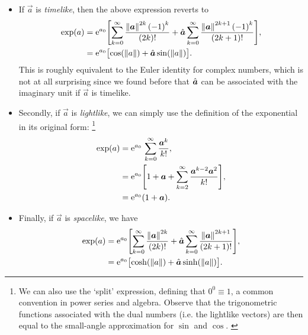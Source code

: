 \begin{itemize}
    \item If \(\vec{a}\) is \emph{timelike}, then the above expression reverts to
        \begin{equation}
            \begin{split}
                \exp(a) &= \ec^{a_0}\qty[\sum_{k=0}^\infty \frac{\norm{\vec{a}}^{2k}\,\qty(-1)^k}{(2k)!} + \uvec{a}\sum_{k=0}^\infty \frac{\norm{\vec{a}}^{2k+1} \, \qty(-1)^k}{(2k+1)!}], \\
                        &= \ec^{a_0}\qty\big[\cos(\norm{a})  + \uvec{a}\sin(\norm{a})]. \\
            \end{split}
        \end{equation}
        This is roughly equivalent to the Euler identity for complex numbers, which is not at all surprising since we found before that \(\uvec{a}\) can be associated with the imaginary unit if \(\vec{a}\) is timelike.
    \item Secondly, if \(\vec{a}\) is \emph{lightlike}, we can simply use the definition of the exponential in its original form: \footnote{We can also use the `split' expression, defining that \(0^0 \equiv 1\), a common convention in power series and algebra. Observe that the trigonometric functions associated with the dual numbers (i.e. the lightlike vectors) are then equal to the small-angle approximation for \(\sin\) and \(\cos\). \cite{Graham1994, Harkin2004}}
        \begin{equation}
            \begin{split}
                \exp(a) &= \ec^{a_0}\,\sum^{\infty}_{k=0} \frac{\vec{a}^k}{k!}, \\
                        &= \ec^{a_0}\qty[1 + \vec{a} + \sum^{\infty}_{k=2} \frac{\vec{a}^{k-2}\vec{a}^2}{k!}], \\
                        &= \ec^{a_0}\qty(1 + \vec{a}). \\
            \end{split}
        \end{equation}
    \item Finally, if \(\vec{a}\) is \emph{spacelike}, we have
        \begin{equation}
            \begin{split}
                \exp(a) &= \ec^{a_0}\qty[\sum_{k=0}^\infty \frac{\norm{\vec{a}}^{2k}}{(2k)!} 
                           + \uvec{a}\sum_{k=0}^\infty \frac{\norm{\vec{a}}^{2k+1}}{(2k+1)!}], \\
                        &= \ec^{a_0}\qty\big[\cosh(\norm{a}) + \uvec{a}\sinh(\norm{a})]. \\
            \end{split}
        \end{equation}
\end{itemize}
